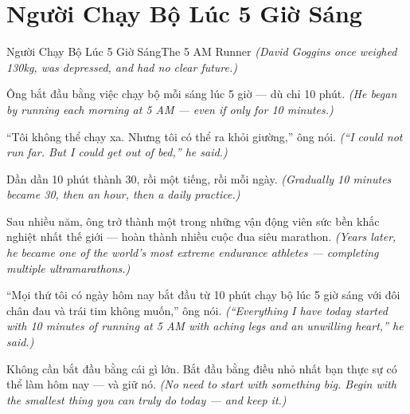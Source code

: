 \section{Người Chạy Bộ Lúc 5 Giờ Sáng}
\begin{truyen}{Người Chạy Bộ Lúc 5 Giờ Sáng}{The 5 AM Runner}
\textit{(David Goggins once weighed 130kg, was depressed, and had no clear future.)}

Ông bắt đầu bằng việc chạy bộ mỗi sáng lúc 5 giờ — dù chỉ 10 phút.
\textit{(He began by running each morning at 5 AM — even if only for 10 minutes.)}

``Tôi không thể chạy xa. Nhưng tôi có thể ra khỏi giường,'' ông nói.
\textit{(``I could not run far. But I could get out of bed,'' he said.)}

Dần dần 10 phút thành 30, rồi một tiếng, rồi mỗi ngày.
\textit{(Gradually 10 minutes became 30, then an hour, then a daily practice.)}

Sau nhiều năm, ông trở thành một trong những vận động viên sức bền khắc nghiệt nhất thế giới — hoàn thành nhiều cuộc đua siêu marathon.
\textit{(Years later, he became one of the world's most extreme endurance athletes — completing multiple ultramarathons.)}

``Mọi thứ tôi có ngày hôm nay bắt đầu từ 10 phút chạy bộ lúc 5 giờ sáng với đôi chân đau và trái tim không muốn,'' ông nói.
\textit{(``Everything I have today started with 10 minutes of running at 5 AM with aching legs and an unwilling heart,'' he said.)}

\end{truyen}

\begin{baihoc}
Không cần bắt đầu bằng cái gì lớn. Bắt đầu bằng điều nhỏ nhất bạn thực sự có thể làm hôm nay — và giữ nó.
\textit{(No need to start with something big. Begin with the smallest thing you can truly do today — and keep it.)}
\end{baihoc}
\ngancach

